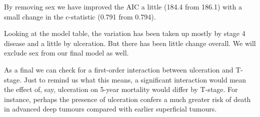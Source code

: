 \documentclass[
  12pt,
  krantz2]{krantz}
\makeatletter
\newenvironment{Shaded}{\begin{snugshade}}{\end{snugshade}}
\newcommand{\DataTypeTok}[1]{\textcolor[rgb]{0.13,0.29,0.53}{#1}}
\newcommand{\KeywordTok}[1]{\textcolor[rgb]{0.13,0.29,0.53}{\textbf{#1}}}
\newcommand{\NormalTok}[1]{#1}
\newcommand{\OperatorTok}[1]{\textcolor[rgb]{0.81,0.36,0.00}{\textbf{#1}}}
\newcommand{\OtherTok}[1]{\textcolor[rgb]{0.56,0.35,0.01}{#1}}
\newcommand{\StringTok}[1]{\textcolor[rgb]{0.31,0.60,0.02}{#1}}
\newenvironment{kframe}{%
\medskip{}
\setlength{\fboxsep}{.8em}
 \def\at@end@of@kframe{}%
 \ifinner\ifhmode%
  \def\at@end@of@kframe{\end{minipage}}%
  \begin{minipage}{\columnwidth}%
 \fi\fi%
 \def\FrameCommand##1{\hskip\@totalleftmargin \hskip-\fboxsep
 \colorbox{shadecolor}{##1}\hskip-\fboxsep
     \hskip-\linewidth \hskip-\@totalleftmargin \hskip\columnwidth}%
 \MakeFramed {\advance\hsize-\width
   \@totalleftmargin\z@ \linewidth\hsize
   \@setminipage}}%
 {\par\unskip\endMakeFramed%
 \at@end@of@kframe}
\renewenvironment{Shaded}{\begin{kframe}}{\end{kframe}}
\makeatother
\begin{document}
By removing sex we have improved the AIC a little (184.4 from 186.1) with a small change in the c-statistic (0.791 from 0.794).

Looking at the model table, the variation has been taken up mostly by stage 4 disease and a little by ulceration.
But there has been little change overall.
We will exclude sex from our final model as well.

As a final we can check for a first-order interaction between ulceration and T-stage.
Just to remind us what this means, a significant interaction would mean the effect of, say, ulceration on 5-year mortality would differ by T-stage.
For instance, perhaps the presence of ulceration confers a much greater risk of death in advanced deep tumours compared with earlier superficial tumours.

\begin{Shaded}
\end{Shaded}
\end{document}
